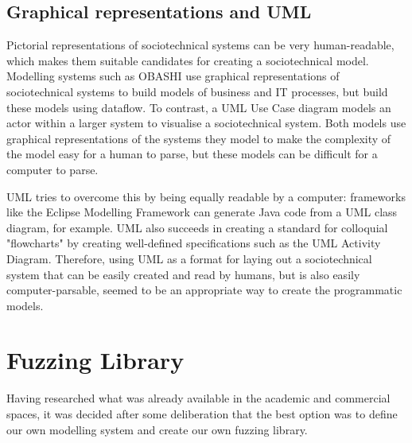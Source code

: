\subsection{Graphical representations and UML}
\label{pictorial}
Pictorial representations of sociotechnical systems can be very human-readable, which makes them suitable candidates for creating a sociotechnical model. Modelling systems such as OBASHI\cite{ObashiMethodology} use graphical representations of sociotechnical systems to build models of business and IT processes, but build these models using dataflow. To contrast, a UML Use Case diagram\cite{Omg2010} models an actor within a larger system to visualise a sociotechnical system. Both models use graphical representations of the systems they model to make the complexity of the model easy for a human to parse, but these models can be difficult for a computer to parse. \par
UML tries to overcome this by being equally readable by a computer: frameworks like the Eclipse Modelling Framework can generate Java code from a UML class diagram, for example\cite{EMFManual}. UML also succeeds in creating a standard for colloquial "flowcharts" by creating well-defined specifications such as the UML Activity Diagram. Therefore, using UML as a format for laying out a sociotechnical system that can be easily created and read by humans, but is also easily computer-parsable, seemed to be an appropriate way to create the programmatic models.


\section{Fuzzing Library}  
\label{planning_head}
Having researched what was already available in the academic and commercial spaces, it was decided after some deliberation that the best option was to define our own modelling system and create our own fuzzing library. 

